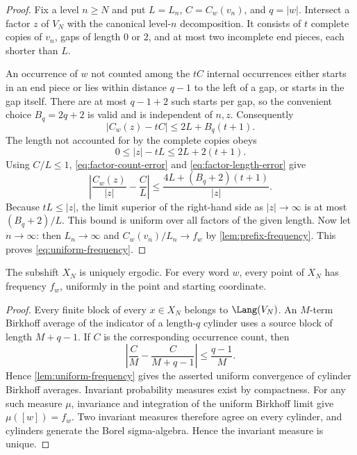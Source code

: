 \begin{proof}
Fix a level $n\geq N$ and put $L=L_n$, $C=C_w(v_n)$, and $q=|w|$.
Intersect a factor $z$ of $V_N$ with the canonical level-$n$ decomposition.
It consists of $t$ complete copies of $v_n$, gaps of length $0$ or $2$, and
at most two incomplete end pieces, each shorter than $L$.

An occurrence of $w$ not counted among the $tC$ internal occurrences either
starts in an end piece or lies within distance $q-1$ to the left of a gap, or
starts in the gap itself.  There are at most $q-1+2$ such starts per gap, so
the convenient choice $B_q=2q+2$ is valid and is independent of $n,z$.
Consequently
\begin{equation}\label{eq:factor-count-error}
 |C_w(z)-tC|\leq 2L+B_q(t+1).
\end{equation}
The length not accounted for by the complete copies obeys
\begin{equation}\label{eq:factor-length-error}
 0\leq |z|-tL\leq2L+2(t+1).
\end{equation}
Using $C/L\leq1$, \eqref{eq:factor-count-error} and
\eqref{eq:factor-length-error} give
\[
 \left|\frac{C_w(z)}{|z|}-\frac{C}{L}\right|
 \leq \frac{4L+(B_q+2)(t+1)}{|z|}.
\]
Because $tL\leq|z|$, the limit superior of the right-hand side as
$|z|\to\infty$ is at most $(B_q+2)/L$.  This bound is uniform over all factors
of the given length.  Now let $n\to\infty$: then $L_n\to\infty$ and
$C_w(v_n)/L_n\to f_w$ by \cref{lem:prefix-frequency}.  This proves
\eqref{eq:uniform-frequency}.
\end{proof}

\begin{proposition}\label{prop:unique-ergodicity}
The subshift $X_N$ is uniquely ergodic.  For every word $w$, every point of
$X_N$ has frequency $f_w$, uniformly in the point and starting coordinate.
\end{proposition}

\begin{proof}
Every finite block of every $x\in X_N$ belongs to $\Lang(V_N)$.  An $M$-term
Birkhoff average of the indicator of a length-$q$ cylinder uses a source block
of length $M+q-1$.  If $C$ is the corresponding occurrence count, then
\[
 \left|\frac{C}{M}-\frac{C}{M+q-1}\right|
 \leq\frac{q-1}{M}.
\]
Hence \cref{lem:uniform-frequency} gives the asserted uniform convergence of
cylinder Birkhoff averages.  Invariant probability measures exist by
compactness.  For any such measure $\mu$, invariance and integration of the
uniform Birkhoff limit give
$\mu([w])=f_w$.  Two invariant measures therefore agree on every cylinder,
and cylinders generate the Borel sigma-algebra.  Hence the invariant measure
is unique.
\end{proof}
